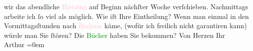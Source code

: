                wir das abendliche \textcolor{pink}{Hietzing}{}\ledrightnote{\textcolor{pink}{XIII., Hietzing}} auf Beginn nächſter Woche
               verſchieben. Nachmittags arbeite ich ſo viel als möglich. Wie iſt Ihre Eintheilung?
               Wenn man einmal in den Vormittagsſtunden nach \textcolor{pink}{Rodaun}{}\ledrightnote{\textcolor{pink}{Rodaun}}
               käme, (wofür ich freilich nicht garantiren kann) würde man Sie ſtören?\pend
           \pstart
           Die \textcolor{green}{Bücher}{} haben Sie
               bekommen? \pend
           \pstart
           Von Herzen Ihr{\\[\baselineskip]}\spacefill\mbox{Arthur}\pend
           \leftskip=0em{}\endnumbering{}  
      